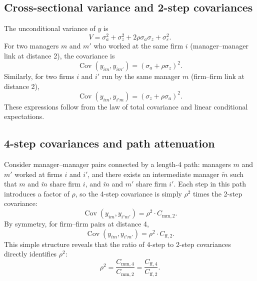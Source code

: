 \documentclass[9pt,twocolumn,twoside]{pnas-new}
\begin{document}
\subsection*{Cross-sectional variance and 2-step covariances}
The unconditional variance of $y$ is
\begin{equation}
\label{eq:var}
 V = \sigma_a^2 + \sigma_z^2 + 2\rho\sigma_a\sigma_z + \sigma_\varepsilon^2.
\end{equation}
For two managers $m$ and $m'$ who worked at the same firm $i$ (manager--manager link at distance 2), the covariance is
\begin{equation}
\label{eq:mm2}
 \operatorname{Cov}(y_{im}, y_{im'}) = (\sigma_a + \rho\sigma_z)^2.
\end{equation}
Similarly, for two firms $i$ and $i'$ run by the same manager $m$ (firm--firm link at distance 2),
\begin{equation}
\label{eq:ff2}
 \operatorname{Cov}(y_{im}, y_{i'm}) = (\sigma_z + \rho\sigma_a)^2.
\end{equation}
These expressions follow from the law of total covariance and linear conditional expectations.

\subsection*{4-step covariances and path attenuation}
Consider manager--manager pairs connected by a length-4 path: managers $m$ and $m'$ worked at firms $i$ and $i'$, and there exists an intermediate manager $\tilde m$ such that $m$ and $\tilde m$ share firm $i$, and $\tilde m$ and $m'$ share firm $i'$. Each step in this path introduces a factor of $\rho$, so the 4-step covariance is simply $\rho^2$ times the 2-step covariance:
\begin{equation}
\label{eq:mm4}
 \operatorname{Cov}(y_{im}, y_{i'm'}) = \rho^2 \cdot C_{\text{mm},2}.
\end{equation}
By symmetry, for firm--firm pairs at distance 4,
\begin{equation}
\label{eq:ff4}
 \operatorname{Cov}(y_{im}, y_{i'm'}) = \rho^2 \cdot C_{\text{ff},2}.
\end{equation}
This simple structure reveals that the ratio of 4-step to 2-step covariances directly identifies $\rho^2$:
\begin{equation}
\label{eq:rho-ratio}
 \rho^2 = \frac{C_{\text{mm},4}}{C_{\text{mm},2}} = \frac{C_{\text{ff},4}}{C_{\text{ff},2}}.
\end{equation}
\end{document}
